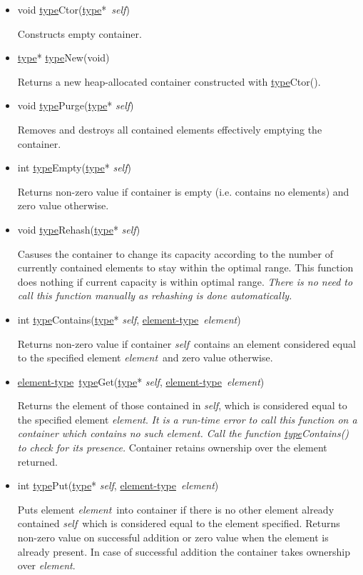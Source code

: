 \documentclass[a4paper]{article}
\newcommand{\st}{\underline{type}}
\newcommand{\et}{\underline{element-type}}
\newcommand{\sv}{\emph{self}}
\newcommand{\ev}{\emph{element}}
\newcommand{\meth}[1]{#1}
\begin{document}
\begin{itemize}


\item \meth{void \st Ctor(\st*\ \sv)}


Constructs empty container.


\item \meth{\st* \st New(void)}


Returns a new heap-allocated container constructed with \meth{\st Ctor()}.


\commonmethods


\item \meth{void \st Purge}(\st* \sv)


Removes and destroys all contained elements effectively emptying the container.


\item \meth{int \st Empty}(\st* \sv)


Returns non-zero value if container is empty (i.e. contains no elements) and zero value otherwise.


\item \meth{void \st Rehash(\st* \sv)}


Casuses the container to change its capacity according to the number of currently contained elements to stay within the optimal range.
This function does nothing if current capacity is within optimal range.
\emph{There is no need to call this function manually as rehashing is done automatically.}


\item \meth{int \st Contains(\st* \sv, \et\ \ev)}


Returns non-zero value if container \sv\ contains an element considered equal to the specified element \ev\ and zero value otherwise.


\item \meth{\et\ \st Get(\st* \sv, \et\ \ev)}


Returns the element of those contained in \sv, which is considered equal to the specified element \ev.
\emph{It is a run-time error to call this function on a container which contains no such element. Call the function \meth{\st Contains()} to check for its presence.}
Container retains ownership over the element returned.


\item \meth{int \st Put(\st* \sv, \et\ \ev)}


Puts element \ev\ into container if there is no other element already contained \sv\ which is considered equal to the element specified.
Returns non-zero value on successful addition or zero value when the element is already present.
In case of successful addition the container takes ownership over \ev.



\end{itemize}
\end{document}
